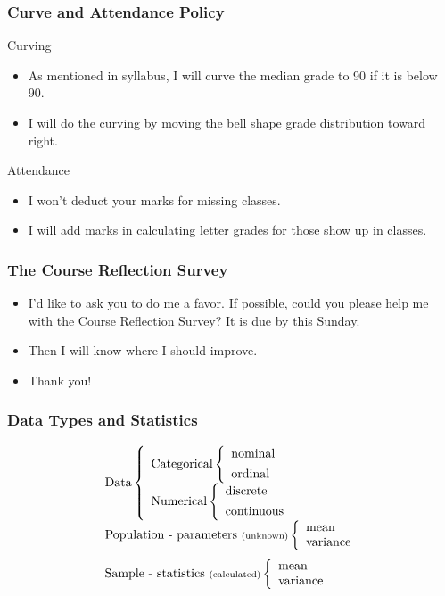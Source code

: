 \documentclass[12pt]{beamer}
\begin{document}
	\begin{frame}
	\frametitle{Curve and Attendance Policy}
	Curving
	\begin{itemize}[label={\color{blue}$\blacktriangleright$}]
		\item As mentioned in syllabus, I will curve the median grade to 90 if it is below 90.
		\item I will do the curving by moving the bell shape grade distribution toward right.
	\end{itemize}
	Attendance
	\begin{itemize}[label={\color{blue}$\blacktriangleright$}]
	\item I won't deduct your marks for missing classes.
\item I will add marks in calculating letter grades for those show up in classes.
	\end{itemize}

\end{frame}
	\begin{frame}
	\frametitle{The Course Reflection Survey}
	\begin{itemize}[label={\color{blue}$\blacktriangleright$}]
\item I'd like to ask you to do me a favor. If possible, could you please help me with the Course Reflection Survey? It is due by this Sunday.

\item Then I will know where I should improve.

\item Thank you!
	\end{itemize}
\end{frame}
\begin{frame}
	\frametitle{Data Types and Statistics}
	\[
	\begin{array}{l}
		\text{Data} 
		\left\{
		\begin{array}{l}
			\text{Categorical}
			\left\{
			\begin{array}{l}
				\text{nominal} \\[1ex]
				\text{ordinal}
			\end{array}
			\right. \\[2ex]
			\text{Numerical}
			\left\{
			\begin{array}{l}
				\text{discrete} \\[1ex]
				\text{continuous}
			\end{array}
			\right.
		\end{array}
		\right. \\[4ex]
		\text{Population - parameters}\ \text{\scriptsize(unknown)}
		\left\{
		\begin{array}{l}
			\text{mean} \\
			\text{variance}
		\end{array}
		\right. \\[3ex]
		\text{Sample - statistics}\ \text{\scriptsize(calculated)}
		\left\{
		\begin{array}{l}
			\text{mean} \\
			\text{variance}
		\end{array}
		\right.
	\end{array}
	\]
\end{frame}
\end{document}
